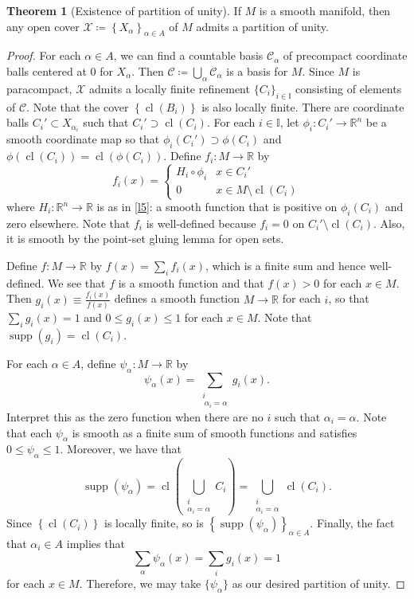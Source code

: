 \documentclass[10pt,letterpaper,cm]{nupset}
\theoremstyle{definition}
\theoremstyle{theorem}
\newtheorem{theorem}[definition]{Theorem}
\theoremstyle{remark}
\newcommand{\R}{\mathbb R}
\newcommand{\1}{\mathbf{1}}
\newcommand{\0}{\vec 0}
\DeclareMathOperator{\supp}{supp}
\DeclareMathOperator{\cl}{cl}
\begin{document}
\begin{theorem}[Existence of partition of unity]
If $M$ is a smooth manifold, then any open cover $\mathcal{X}\coloneqq \left\{X_{\alpha}\right\}_{\alpha \in A}$ of $M$ admits a partition of unity. 
\end{theorem}
\begin{proof}
For each $\alpha \in A$, we can find a countable basis $\mathcal{C}_{\alpha}$ of precompact  coordinate balls centered at $0$ for $X_{\alpha}$. Then $\mathcal{C}\coloneqq \bigcup_{\alpha} \mathcal{C}_{\alpha}$ is a basis for $M$. Since $M$ is paracompact, $\mathcal{X}$ admits a locally finite refinement $\{C_i\}_{i\in \mathbb{I}}$ consisting of elements of $\mathcal{C}$. Note that the cover $\left\{\cl(B_i)\right\}$ is also locally finite. There are coordinate balls $C_i' \subset X_{\alpha_i}$ such that $ C_i'\supset \cl(C_i)$. For each $i\in \mathbb{I}$, let $\phi_i : C_i' \to \R^n$ be a smooth coordinate map so that $\phi_i(C_i') \supset \phi(C_i)$ and $\phi(\cl(C_i)) = \cl\left(\phi(C_i)\right)$. Define $f_i: M \to \R$ by $$f_i(x) = \begin{cases}  H_i \circ \phi_i &   x\in C_i' \\ 0 & x \in M \setminus \cl(C_i)    \end{cases}      $$ where $H_i: \R^n \to \R$ is as in \cref{l5}: a smooth function that is positive on $\phi_i(C_i)$ and zero elsewhere. Note that $f_i$ is well-defined because $f_i=0$ on $C_i' \setminus \cl(C_i)$. Also, it is smooth by the point-set gluing lemma for open sets. 

\medskip


Define $f: M \to \R$ by $f(x) = \sum_{i}f_i(x)$, which is a finite sum and hence well-defined. We see that $f$ is a smooth function and that $f(x) >0$ for each $x\in M$. Then $g_i(x) \equiv \frac{f_i(x)}{f(x)}$ defines a smooth function $M \to \R$ for each $i$, so that $\sum_i g_i(x) = 1$ and $0\leq g_i(x) \leq 1$ for each $x\in M$. Note that $\supp(g_i) = \cl(C_i)$. 

\medskip


For each $\alpha \in A$, define $\psi_{\alpha} : M \to \R$ by $$\psi_{\alpha}(x) = \sum_{\substack{i \\ \ \alpha_i=\alpha}}g_i(x)     .$$ Interpret this as the zero function when there are no $i$ such that $\alpha_i = \alpha$.  Note that each $\psi_{\alpha}$ is smooth as a finite sum of smooth functions and satisfies $0\leq  \psi_{\alpha} \leq 1$. Moreover, we have that $$\supp(\psi_{\alpha}) = \cl \left(\bigcup_{\substack{i \\ \alpha_i=\alpha}} C_i \right)= \bigcup_{\substack{i \\ \alpha_i=\alpha}} \cl(C_i). $$ Since $\left\{\cl(C_i)\right\}$ is locally finite, so is $\left\{\supp(\psi_{\alpha})\right\}_{\alpha \in A}$. Finally, the fact that $\alpha_i \in A$ implies that $$\sum_{\alpha} \psi_{\alpha}(x) = \sum_i g_i(x) =1$$ for each $x\in M$. Therefore, we may take $\{\psi_{\alpha}\}$ as our desired partition of unity. 
\end{proof}
\end{document}
